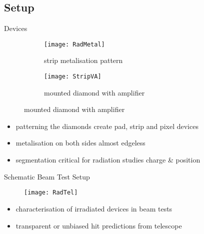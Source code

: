 \subsection{Setup}
\begin{frame}{Devices}

	\begin{figure}[h] 
		\centering
		\begin{subfigure}{0.45\textwidth}  
			\centering
			\texttt{[image: RadMetal]}
			\caption{strip metalisation pattern}
		\end{subfigure}
		\begin{subfigure}{0.45\textwidth} 
			\centering
			\texttt{[image: StripVA]}
			\caption{mounted diamond with amplifier} 	
		\end{subfigure} 
	\end{figure}
	
	\begin{itemize}
		\itemfill
		\item patterning the diamonds \ra create pad, strip and pixel devices
		\item metalisation on both sides \ra almost edgeless 
		\item segmentation critical for radiation studies \ra charge \& position
	\end{itemize}

\end{frame}
\begin{frame}{Schematic Beam Test Setup}

	\begin{figure}[h] 
		\centering
		\texttt{[image: RadTel]}
	\end{figure}
	
	\begin{itemize}
		\itemfill
		\item characterisation of irradiated devices in beam tests
		\item transparent or unbiased hit predictions from telescope
	\end{itemize}

\end{frame}

